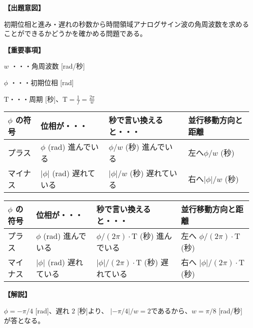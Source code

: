\noindent \textbf{【出題意図】}

\noindent 初期位相と進み・遅れの秒数から時間領域アナログサイン波の角周波数を求めることができるかどうかを確かめる問題である。

\vspace{1em}
\noindent \textbf{【重要事項】}

\bigskip
\noindent $w$ ・・・角周波数 [rad/秒]

\bigskip
\noindent $\phi$ ・・・初期位相 [rad]

\bigskip
$\textrm{T}$・・・周期 [秒]、$\textrm{T} = \frac{1}{f} = \frac{2\pi}{w}$

\begin{center}
\begin{tabularx}{0.9\fbwidth}{|X|X|X|X|}
\hline
$\phi$ の符号&  位相が・・・   & 秒で言い換えると・・・   & 並行移動方向と距離 \\
\hline
プラス &  $\phi$ (rad) 進んでいる & $\phi/w$ (秒) 進んでいる & 左へ$\phi/w$ (秒) \\
\hline
マイナス &  $|\phi|$ (rad) 遅れている & $|\phi|/w$ (秒) 遅れている & 右へ$|\phi|/w$ (秒) \\
\hline
\end{tabularx}

\medskip
\begin{tabularx}{0.9\fbwidth}{|X|X|X|X|}
\hline
$\phi$ の符号&  位相が・・・   & 秒で言い換えると・・・   & 並行移動方向と距離 \\
\hline
プラス &  $\phi$ (rad) 進んでいる & $\phi/(2\pi) \cdot \textrm{T}$ (秒) 進んでいる & 左へ $\phi/(2\pi) \cdot \textrm{T}$ (秒) \\
\hline
マイナス &  $|\phi|$ (rad) 遅れている & $|\phi|/(2\pi) \cdot \textrm{T}$ (秒) 遅れている & 右へ $|\phi|/(2\pi) \cdot \textrm{T}$ (秒) \\
\hline
\end{tabularx}
\end{center}

\vspace{1em}
\noindent \textbf{【解説】}

\noindent $\phi = -\pi/4$ [rad]、遅れ $2$ [秒]より、 $|-\pi/4|/w = 2$であるから、$w = \pi/8$ [rad/秒]が答となる。
